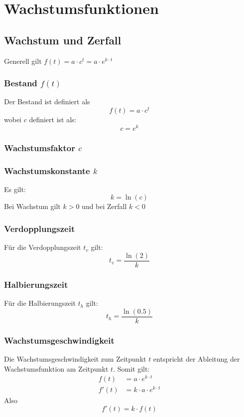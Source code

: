 \documentclass[a4paper,12pt]{article}
\begin{document}
\section{Wachstumsfunktionen}


\subsection{Wachstum und Zerfall}
Generell gilt $f(t) = a \cdot c^t = a \cdot e^{k \cdot t}$ 
\subsubsection{Bestand $f(t)$}
Der Bestand ist definiert als
$$f(t) = a \cdot c^t$$
wobei $c$ definiert ist als:
$$c = e^k$$
\subsubsection{Wachstumsfaktor $c$}
\subsubsection{Wachstumskonstante $k$}
Es gilt:
$$k = \ln{(c)}$$
Bei Wachstum gilt $k > 0$ und bei Zerfall $k < 0$
\subsubsection{Verdopplungszeit}
Für die Verdopplungszeit $t_v$ gilt:
$$t_v = \frac{\ln{(2)}}{k}$$
\subsubsection{Halbierungszeit}
Für die Halbierungszeit $t_h$ gilt:
$$t_h = \frac{\ln{(0.5)}}{k}$$
\subsubsection{Wachstumsgeschwindigkeit}
Die Wachstumsgeschwindigkeit zum Zeitpunkt $t$ entspricht der Ableitung der Wachstumsfunktion am Zeitpunkt $t$.
Somit gilt:
\begin{equation}
\begin{split}
f(t) & = a \cdot e^{k \cdot t}\\
f'(t) &= k \cdot a \cdot e^{k \cdot t}
\end{split}
\end{equation}
Also $$f'(t) = k \cdot f(t)$$
\pagebreak
\end{document}
